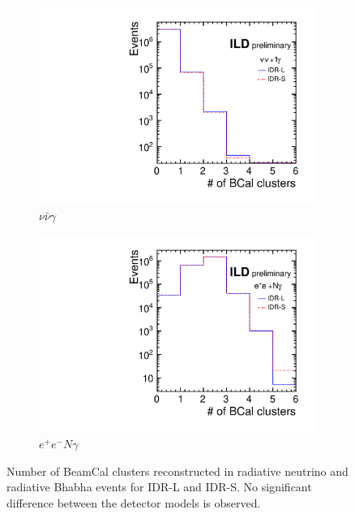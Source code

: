 \begin{figure}[htbp]
\begin{subfigure}{0.49\hsize} 
\includegraphics[width=\textwidth]{Performance/fig/bcalveto_vv1g_comp.pdf}
 \caption{$\nu\bar{\nu}\gamma$ \label{fig:WIMP:BCal:IDR-L}}
 \end{subfigure}
\begin{subfigure}{0.49\hsize} 
\includegraphics[width=\textwidth]{Performance/fig/bcalveto_eeNg_comp.pdf}
\caption{$e^+e^- N\gamma$ \label{fig:WIMP:BCal:IDR-S}}
 \end{subfigure}
\caption{Number of BeamCal clusters reconstructed in radiative neutrino and radiative Bhabha events for IDR-L and IDR-S. No significant difference between the detector models is observed.
}
\label{fig:WIMP:BCal}
\end{figure}

